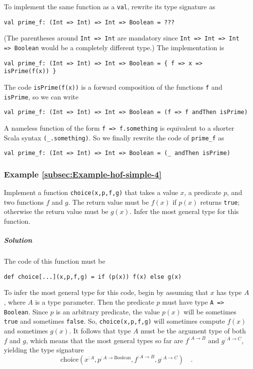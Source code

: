 To implement the same function as a \lstinline!val!, rewrite its
type signature as
\begin{lstlisting}
val prime_f: (Int => Int) => Int => Boolean = ???
\end{lstlisting}
(The parentheses around \lstinline!Int => Int! are mandatory since
\lstinline!Int => Int => Int => Boolean! would be a completely different
type.) The implementation is
\begin{lstlisting}
val prime_f: (Int => Int) => Int => Boolean = { f => x => isPrime(f(x)) }
\end{lstlisting}
The code \lstinline!isPrime(f(x))! is a forward composition of the
functions \lstinline!f! and \lstinline!isPrime!, so we can write
\begin{lstlisting}
val prime_f: (Int => Int) => Int => Boolean = (f => f andThen isPrime)
\end{lstlisting}
A nameless function of the form \lstinline!f => f.something! is equivalent
to a shorter Scala syntax \lstinline!(_.something)!. So we finally
rewrite the code of \lstinline!prime_f! as
\begin{lstlisting}
val prime_f: (Int => Int) => Int => Boolean = (_ andThen isPrime)
\end{lstlisting}


\subsubsection{Example \label{subsec:Example-hof-simple-4}\ref{subsec:Example-hof-simple-4}}

Implement a function \lstinline!choice(x,p,f,g)! that takes a value
$x$, a predicate $p$, and two functions $f$ and $g$. The return
value must be $f(x)$ if $p(x)$ returns \lstinline!true!; otherwise
the return value must be $g(x)$. Infer the most general type for
this function.

\subparagraph{Solution}

The code of this function must be
\begin{lstlisting}
def choice[...](x,p,f,g) = if (p(x)) f(x) else g(x)
\end{lstlisting}
To infer the most general type for this code, begin by assuming that
$x$ has type $A$, where $A$ is a type parameter. Then the predicate
$p$ must have type \lstinline!A => Boolean!. Since $p$ is an arbitrary
predicate, the value $p(x)$ will be sometimes \lstinline!true! and
sometimes \lstinline!false!. So, \lstinline!choice(x,p,f,g)! will
sometimes compute $f(x)$ and sometimes $g(x)$. It follows that type
$A$ must be the argument type of both $f$ and $g$, which means
that the most general types so far are $f^{:A\rightarrow B}$ and
$g^{:A\rightarrow C}$, yielding the type signature
\[
\text{choice}(x^{:A},p^{:A\rightarrow\text{Boolean}},f^{:A\rightarrow B},g^{:A\rightarrow C})\quad.
\]

